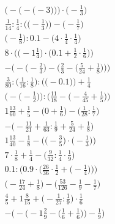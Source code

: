 \documentclass[8pt]{article}
\begin{document}
\begin{align}
\bigg(-\Big(-\big(-3\big)\Big)\bigg) \cdot \bigg(-\frac{1}{3}\bigg) \\
\frac{1}{14} : \frac{1}{4} : \Big(\big(-\frac{1}{3}\big)\Big) - \Big(-\frac{1}{7}\Big) \\
\big(-\frac{1}{8}\big) : 0.1 - \big(4 \cdot \frac{1}{4} \cdot \frac{1}{4}\big) \\
8 \cdot \Big(\big(-1\frac{1}{4}\big) \cdot \big(0.1 + \frac{1}{2} \cdot \frac{1}{6}\big)\Big) \\
-\bigg(-\Big(-\frac{2}{3}\Big) - \Big(\frac{2}{3} - \big(\frac{5}{24} + \frac{1}{8}\big)\Big)\bigg) \\
\frac{3}{80} : \Big(\frac{1}{16} : \frac{1}{8}\Big) : \Big(\big(-0.1\big)\Big) + \frac{1}{4} \\
\Big(-\big(-\frac{1}{2}\big)\Big) : \Big(\frac{11}{18} - \big(-\frac{4}{45} + \frac{1}{5}\big)\Big) \\
1\frac{13}{60} + \frac{1}{5} - \big(0 + \frac{1}{6}\big) - \big(\frac{1}{28} : \frac{1}{7}\big) \\
-\big(-\frac{11}{21} + \frac{1}{63} : \frac{1}{9} + \frac{5}{24} + \frac{1}{8}\big) \\
1\frac{13}{40} - \frac{1}{8} - \Big(\big(-\frac{3}{5}\big) \cdot \big(-\frac{1}{3}\big)\Big) \\
7 \cdot \frac{1}{8} + \frac{1}{4} - \big(\frac{9}{32} : \frac{1}{4} \cdot \frac{1}{9}\big) \\
0.1 : \bigg(0.9 \cdot \Big(\frac{26}{36} \cdot \frac{1}{2} + \big(-\frac{1}{4}\big)\Big)\bigg) \\
\big(-\frac{17}{24} + \frac{1}{8}\big) - \big(\frac{53}{126} - \frac{1}{9} - \frac{1}{7}\big) \\
\frac{4}{5} + 1\frac{8}{15} + \big(-\frac{1}{27} : \frac{1}{9}\big) \cdot \frac{1}{6} \\
-\bigg(-\Big(-1\frac{2}{9} - \big(\frac{1}{6} + \frac{1}{6}\big)\Big) - \frac{1}{9}\bigg)
\end{align}
\end{document}
